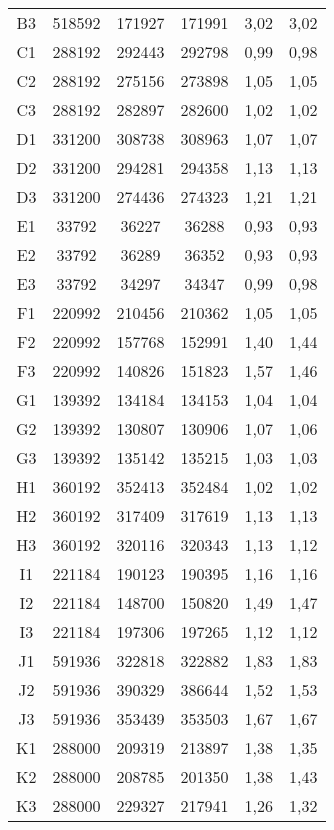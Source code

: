 \begin{center}
\begin{longtable}{cccccc}
    B3    & 518592 & 171927 & 171991 & 3,02  & 3,02 \\
    C1    & 288192 & 292443 & 292798 & 0,99  & 0,98 \\
    C2    & 288192 & 275156 & 273898 & 1,05  & 1,05 \\
    C3    & 288192 & 282897 & 282600 & 1,02  & 1,02 \\
    D1    & 331200 & 308738 & 308963 & 1,07  & 1,07 \\
    D2    & 331200 & 294281 & 294358 & 1,13  & 1,13 \\
    D3    & 331200 & 274436 & 274323 & 1,21  & 1,21 \\
    E1    & 33792 & 36227 & 36288 & 0,93  & 0,93 \\
    E2    & 33792 & 36289 & 36352 & 0,93  & 0,93 \\
    E3    & 33792 & 34297 & 34347 & 0,99  & 0,98 \\
    F1    & 220992 & 210456 & 210362 & 1,05  & 1,05 \\
    F2    & 220992 & 157768 & 152991 & 1,40  & 1,44 \\
    F3    & 220992 & 140826 & 151823 & 1,57  & 1,46 \\
    G1    & 139392 & 134184 & 134153 & 1,04  & 1,04 \\
    G2    & 139392 & 130807 & 130906 & 1,07  & 1,06 \\
    G3    & 139392 & 135142 & 135215 & 1,03  & 1,03 \\
    H1    & 360192 & 352413 & 352484 & 1,02  & 1,02 \\
    H2    & 360192 & 317409 & 317619 & 1,13  & 1,13 \\
    H3    & 360192 & 320116 & 320343 & 1,13  & 1,12 \\
    I1    & 221184 & 190123 & 190395 & 1,16  & 1,16 \\
    I2    & 221184 & 148700 & 150820 & 1,49  & 1,47 \\
    I3    & 221184 & 197306 & 197265 & 1,12  & 1,12 \\
    J1    & 591936 & 322818 & 322882 & 1,83  & 1,83 \\
    J2    & 591936 & 390329 & 386644 & 1,52  & 1,53 \\
    J3    & 591936 & 353439 & 353503 & 1,67  & 1,67 \\
    K1    & 288000 & 209319 & 213897 & 1,38  & 1,35 \\
    K2    & 288000 & 208785 & 201350 & 1,38  & 1,43 \\
    K3    & 288000 & 229327 & 217941 & 1,26  & 1,32 \\

\end{longtable}
\end{center}
